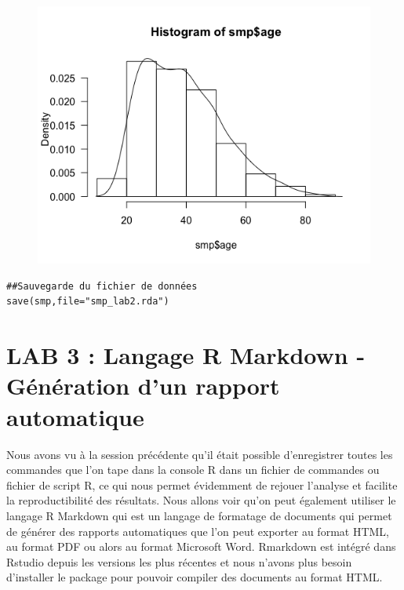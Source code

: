 \begin{figure}[H]\begin{center}\includegraphics[scale=0.45]{ilu/lab2-8.png}\end{center}\end{figure}
\begin{lstlisting}[language=html]
##Sauvegarde du fichier de données
save(smp,file="smp_lab2.rda")
\end{lstlisting}

\newpage

\section{LAB 3 : Langage R Markdown - Génération d'un rapport automatique}

Nous avons vu à la session précédente qu'il était possible d'enregistrer toutes les commandes que l'on tape dans la console R dans un fichier de commandes ou fichier de script R, ce qui nous permet évidemment de rejouer l'analyse et facilite la reproductibilité des résultats.\newline
Nous allons voir qu'on peut également utiliser le langage R Markdown qui est un langage de formatage de documents qui permet de générer des rapports automatiques que l'on peut exporter au format HTML, au format PDF ou alors au format Microsoft Word.\newline
Rmarkdown est intégré dans Rstudio depuis les versions les plus récentes et nous n'avons plus besoin d'installer le package pour pouvoir compiler des documents au format HTML.

